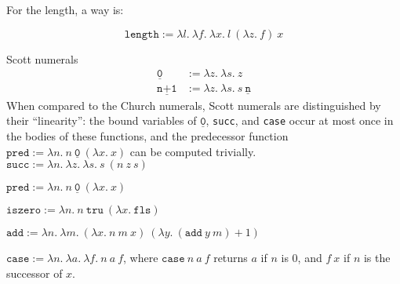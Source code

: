 \documentclass{article}
\theoremstyle{definition}
\newcommand{\fls}{\texttt{fls}\xspace}
\newcommand{\tru}{\texttt{tru}\xspace}
\renewcommand{\l}[1]{\lambda #1.~}
\newcommand{\snum}[1]{\underline{\texttt{#1}}}
\begin{document}
For the length, a way is:

\[
  \texttt{length} := \l{l} \l{f} \l{x} l~(\l{z} f)~x
\]

\newpage
Scott numerals
\begin{align*}
  \snum{0} &:= \l{z} \l{s} z \\
  \snum{n+1} &:= \l{z} \l{s} s~\snum{n}
\end{align*}
When compared to the Church numerals, Scott numerals are distinguished by
their ``linearity'': the bound variables of \(\snum{0}\), \texttt{succ}, and
\texttt{case} occur at most once in the bodies of these functions,
and the predecessor function \(\texttt{pred} := \l{n} n~\snum{0}~(\l{x} x)\)
can be computed trivially\cite{ACP93}.
\\

\(\mathtt{succ} := \l{n} \l{z} \l{s} s~(n~z~s)\)

\(\mathtt{pred} := \l{n} n~\snum{0}~(\l{x} x)\)

\(\mathtt{iszero} := \l{n} n~\tru~(\l{x} \fls)\)

\(\mathtt{add} := \l{n} \l{m} (\l{x} n~m~x)~(\l{y} (\mathtt{add}~y~m) + 1) \)

\(\mathtt{case} := \l{n} \l{a} \l{f} n~a~f\), where \(\mathtt{case}~n~a~f\)
returns \(a\) if \(n\) is 0, and \(f~x\) if \(n\) is the successor of \(x\).



\end{document}
